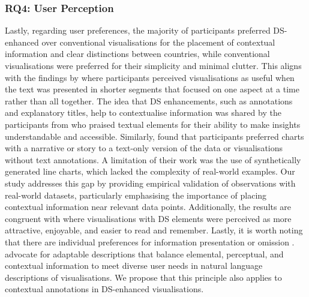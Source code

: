\subsubsection{RQ4: User Perception} Lastly, regarding user preferences, the majority of participants preferred DS-enhanced over conventional visualisations for the placement of contextual information and clear distinctions between countries, while conventional visualisations were preferred for their simplicity and minimal clutter. This aligns with the findings by \citet{yen2020} where participants perceived visualisations as useful when the text was presented in shorter segments that focused on one aspect at a time rather than all together. The idea that DS enhancements, such as annotations and explanatory titles, help to contextualise information was shared by the participants from \citet{echeverria2018exploratory, stokes2022text, milesi2024storytelling} who praised textual elements for their ability to make insights understandable and accessible. Similarly, \citet{stokes2023striking} found that participants preferred charts with a narrative or story to a text-only version of the data or visualisations without text annotations. A limitation of their work was the use of synthetically generated line charts, which lacked the complexity of real-world examples. Our study addresses this gap by providing empirical validation of \citet{stokes2022text,stokes2023striking} observations with real-world datasets, particularly emphasising the importance of placing contextual information near relevant data points. Additionally, the results are congruent with \citet{bateman2010} where visualisations with DS elements were perceived as more attractive, enjoyable, and easier to read and remember. Lastly, it is worth noting that there are individual preferences for information presentation or omission \cite{lundgard2022accessible}. \citet {lundgard2022accessible} advocate for adaptable descriptions that balance elemental, perceptual, and contextual information to meet diverse user needs in natural language descriptions of visualisations. We propose that this principle also applies to contextual annotations in DS-enhanced visualisations.

